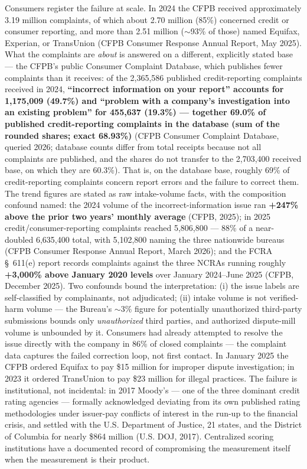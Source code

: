 \documentclass[
]{article}
\begin{document}
Consumers register the failure at scale. In 2024 the CFPB received
approximately 3.19 million complaints, of which about 2.70 million
(85\%) concerned credit or consumer reporting, and more than 2.51
million (\(\sim\)93\% of those) named Equifax, Experian, or TransUnion
(CFPB Consumer Response Annual Report, May 2025). What the complaints
are \emph{about} is answered on a different, explicitly stated base ---
the CFPB's public Consumer Complaint Database, which publishes fewer
complaints than it receives: of the 2,365,586 published credit-reporting
complaints received in 2024, \textbf{``incorrect information on your
report'' accounts for 1,175,009 (49.7\%) and ``problem with a company's
investigation into an existing problem'' for 455,637 (19.3\%) ---
together 69.0\% of published credit-reporting complaints in the database
(sum of the rounded shares; exact 68.93\%)} (CFPB Consumer Complaint
Database, queried 2026; database counts differ from total receipts
because not all complaints are published, and the shares do not transfer
to the 2,703,400 received base, on which they are 60.3\%). That is, on
the database base, roughly 69\% of credit-reporting complaints concern
report errors and the failure to correct them. The trend figures are
stated as raw intake-volume facts, with the composition confound named:
the 2024 volume of the incorrect-information issue ran \textbf{+247\%
above the prior two years' monthly average} (CFPB, 2025); in 2025
credit/consumer-reporting complaints reached 5,806,800 --- 88\% of a
near-doubled 6,635,400 total, with 5,102,800 naming the three nationwide
bureaus (CFPB Consumer Response Annual Report, March 2026); and the FCRA
§~611(e) report records complaints against the three NCRAs running
roughly \textbf{+3,000\% above January 2020 levels} over January
2024--June 2025 (CFPB, December 2025). Two confounds bound the
interpretation: (i) the issue labels are self-classified by
complainants, not adjudicated; (ii) intake volume is not verified-harm
volume --- the Bureau's \(\sim\)3\% figure for potentially unauthorized
third-party submissions bounds only \emph{unauthorized} third parties,
and authorized dispute-mill volume is unbounded by it. Consumers had
already attempted to resolve the issue directly with the company in 86\%
of closed complaints --- the complaint data captures the failed
correction loop, not first contact. In January 2025 the CFPB ordered
Equifax to pay \$15 million for improper dispute investigation; in 2023
it ordered TransUnion to pay \$23 million for illegal practices. The
failure is institutional, not incidental: in 2017 Moody's --- one of the
three dominant credit rating agencies --- formally acknowledged
deviating from its own published rating methodologies under issuer-pay
conflicts of interest in the run-up to the financial crisis, and settled
with the U.S. Department of Justice, 21 states, and the District of
Columbia for nearly \$864 million (U.S. DOJ, 2017). Centralized scoring
institutions have a documented record of compromising the measurement
itself when the measurement is their product.
\end{document}
